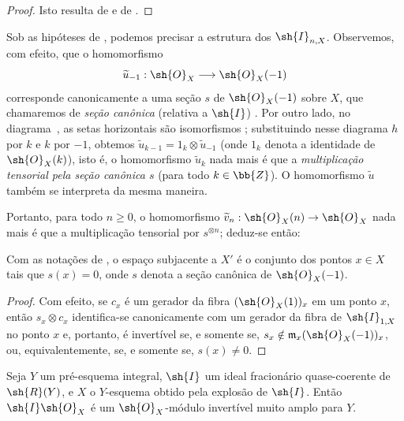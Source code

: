 \documentclass[oneside,10pt]{amsart}
\makeatletter
\renewcommand{\geq}{\geqslant}
\newcommand{\ega@arrow}[2]{\mathchoice{#1}{#2}{#2}{#2}}
\renewcommand{\to}{\ega@arrow{\longrightarrow}{\rightarrow}}
\let\EGAOriginalLabel\label
\renewcommand{\label}[1]{\phantomsection\EGAOriginalLabel{#1}}
\makeatother
\begin{document}
\begin{proof}
Isto resulta de  e de .
\end{proof}

\begin{env}[8.1.9]
\label{II.8.1.9}
Sob as hipóteses de , podemos precisar a estrutura dos $\sh{I}_{n,X}$.
Observemos, com efeito, que o homomorfismo
\[
  \widetilde{u}_{-1}:\sh{O}_X\to\sh{O}_X(-1)
\]
corresponde canonicamente a uma seção $s$ de $\sh{O}_X(-1)$ sobre $X$, que chamaremos de \emph{seção canônica} (relativa a $\sh{I}$) .
Por outro lado, no diagrama~, as setas horizontais são isomorfismos ; substituindo nesse diagrama $h$ por $k$ e $k$ por $-1$, obtemos $\widetilde{u}_{k-1}=1_k\otimes\widetilde{u}_{-1}$ (onde $1_k$ denota a identidade de $\sh{O}_X(k)$), isto é, o homomorfismo $\widetilde{u}_k$ nada mais é que a \emph{multiplicação tensorial pela seção canônica $s$} (para todo $k\in\bb{Z}$).
O homomorfismo $\widetilde{u}$  também se interpreta da mesma maneira.

Portanto, para todo $n\geq0$, o homomorfismo $\widetilde{v}_n:\sh{O}_X(n)\to\sh{O}_X$ nada mais é que a multiplicação tensorial por $s^{\otimes n}$; deduz-se então:
\end{env}

\begin{corollary}[8.1.10]
\label{II.8.1.10}
Com as notações de , o espaço subjacente a $X'$ é o conjunto dos pontos $x\in X$ tais que $s(x)=0$, onde $s$ denota a seção canônica de $\sh{O}_X(-1)$.
\end{corollary}

\begin{proof}
Com efeito, se $c_x$ é um gerador da fibra $(\sh{O}_X(1))_x$ em um ponto $x$, então $s_x\otimes c_x$ identifica-se canonicamente com um gerador da fibra de $\sh{I}_{1,X}$ no ponto $x$ e, portanto, é invertível se, e somente se, $s_x\notin\mathfrak{m}_x(\sh{O}_X(-1))_x$, ou, equivalentemente, se, e somente se, $s(x)\neq0$.
\end{proof}

\begin{proposition}[8.1.11]
\label{II.8.1.11}
Seja $Y$ um pré-esquema integral, $\sh{I}$ um ideal fracionário quase-coerente de $\sh{R}(Y)$, e $X$ o $Y$-esquema obtido pela explosão de $\sh{I}$.
Então $\sh{I}\sh{O}_X$ é um $\sh{O}_X$-módulo invertível muito amplo para $Y$.
\end{proposition}
\end{document}
